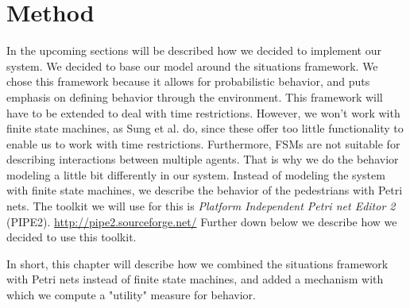 \documentclass[11pt]{book}
\begin{document}
\chapter{Method}
In the upcoming sections will be described how we decided to implement our system. We decided to base our model around the situations framework. We chose this framework because it allows for probabilistic behavior, and puts emphasis on defining behavior through the environment. This framework will have to be extended to deal with time restrictions. However, we won't work with finite state machines, as Sung et al. do, since these offer too little functionality to enable us to work with time restrictions. Furthermore, FSMs are not suitable for describing interactions between multiple agents. That is why we do the behavior modeling a little bit differently in our system. Instead of modeling the system with finite state machines, we describe the behavior of the pedestrians with Petri nets.  The toolkit we will use for this is \emph{Platform Independent Petri net Editor 2} (PIPE2). \url{http://pipe2.sourceforge.net/} Further down below we describe how we decided to use this toolkit.

In short, this chapter will describe how we combined the situations framework with Petri nets instead of finite state machines, and added a mechanism with which we compute a "utility" measure for behavior.
\end{document}
